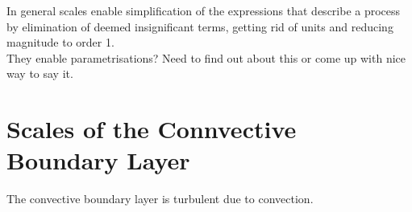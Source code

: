 In general scales enable simplification of the expressions that describe a process by elimination 
of deemed insignificant terms, getting rid of units and reducing magnitude to order 1.\\

They enable parametrisations?  Need to find out about this or come up with nice way to say it.\\

  





\section{Scales of the Connvective Boundary Layer}
\label{sec:ScalesoftheConnvectiveBoundaryLayer}
The convective boundary layer is turbulent due to convection.\\

